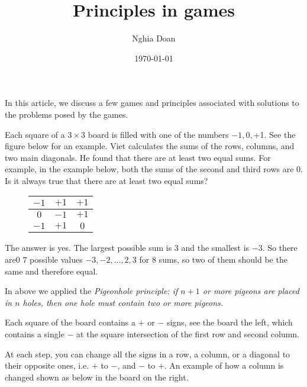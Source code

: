 \documentclass{article}
\title{Principles in games}
\author{Nghia Doan}
\date{\today}
\begin{document}
\maketitle

In this article, we discuss a few games and principles associated with solutions to the problems posed by the games.

\begin{example*}

    Each square of a $3 \times 3$ board is filled with one of the numbers $-1, 0, $+1$.$ See the figure below for an example.
    Viet calculates the sums of the rows, columns, and two main diagonals. He found that there are at least two equal sums.
    For example, in the example below, both the sums of the second and third rows are 0.
    Is it always true that there are at least two equal sums?
\end{example*}

\begin{figure}[h]
    \centering
    \begin{tabular}{|c|c|c|}
        \hline
        $-1$ & $$+1$$ & $$+1$$ \\ \hline
        $0$  & $-1$ & $$+1$$ \\ \hline
        $-1$ & $$+1$$ & $0$  \\ \hline
    \end{tabular}
\end{figure}

\begin{soln}
    The answer is yes. The largest possible sum is $3$ and the smallest is $-3.$
    So there are0 $7$ possible values $-3,-2,\ldots,2,3$ for $8$ sums, so two of them should be the same and therefore equal.

    In above we applied the \textit{Pigeonhole principle: if $n+1$ or more pigeons are placed in $n$ holes,
    then one hole must contain two or more pigeons.} 
\end{soln}

\begin{example*}

    Each square of the  board contains a $+$ or $-$ signs, see the board the left,
    which contains a single $-$ at the square intersection of the first row and second column.

    At each step, you can change all the signs in a row, a column, or a diagonal to their opposite ones, i.e. $+$ to $-$, and $-$  to $+$.
    An example of how a column is changed shown as below in the board on the right.
\end{example*}
\end{document}
